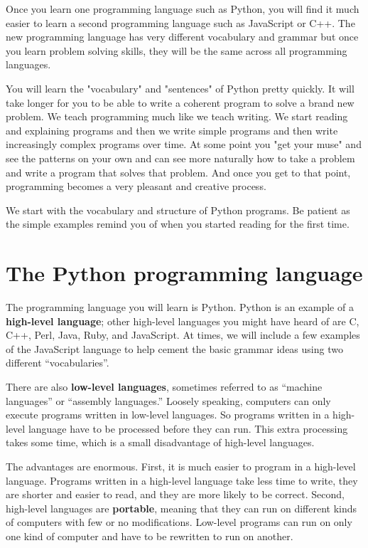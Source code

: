 \documentclass[10pt]{book}
\begin{document}
Once you learn one programming language such as Python, you will 
find it much easier to learn a second programming language such
as JavaScript or C++.  The new programming language has very different 
vocabulary and grammar but once you learn problem solving skills, 
they will be the same across all programming languages.

You will learn the "vocabulary" and "sentences" of Python pretty quickly.
It will take longer for you to be able to write a coherent program
to solve a brand new problem.  We teach programming much like we teach
writing.  We start reading and explaining programs and then we write 
simple programs and then write increasingly complex programs over time.
At some point you "get your muse" and see the patterns on your own
and can see more naturally how to take a problem and 
write a program that solves that problem.  And once you get 
to that point, programming becomes a very pleasant and creative process.  

We start with the vocabulary and structure of Python programs.  Be patient
as the simple examples remind you of when you started reading for the first
time. 

\section{The Python programming language}

The programming language you will learn is Python. Python is
an example of a {\bf high-level language}; other high-level languages
you might have heard of are C, C++, Perl, Java, Ruby, and JavaScript. 
At times, we will include a few examples of the JavaScript language
to help cement the basic grammar ideas using 
two different ``vocabularies''.

There are
also {\bf low-level languages}, sometimes referred to as ``machine
languages'' or ``assembly languages.''  Loosely speaking, computers
can only execute programs written in low-level languages.  So
programs written in a high-level language have to be processed before
they can run.  This extra processing takes some time, which is a small
disadvantage of high-level languages.


The advantages are enormous.  First, it is much easier to program
in a high-level language.  Programs written in a high-level language
take less time to write, they are shorter and easier to read, and they
are more likely to be correct.  Second, high-level languages are {\bf
portable}, meaning that they can run on different kinds of computers
with few or no modifications.  Low-level programs can run on only one
kind of computer and have to be rewritten to run on another.
\end{document}
